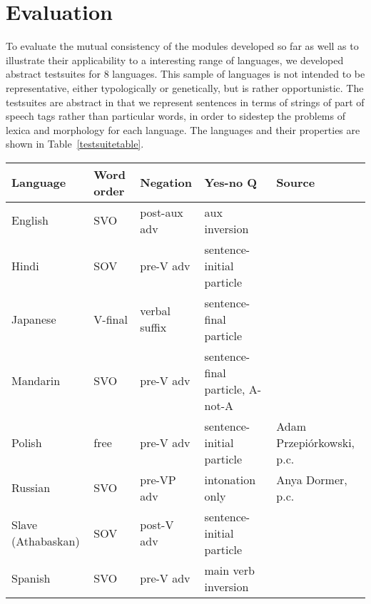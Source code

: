 \documentclass[11pt]{article}
\begin{document}
\section{Evaluation}

To evaluate the mutual consistency of the modules developed so far as
well as to illustrate their applicability to a interesting range of
languages, we developed abstract testsuites for 8 languages.  This
sample of languages is not intended to be representative, either
typologically or genetically, but is rather opportunistic.  The
testsuites are abstract in that we represent sentences in terms of
strings of part of speech tags rather than particular words, in order
to sidestep the problems of lexica and morphology for each language.
The languages and their properties are shown in Table~\ref{testsuitetable}.

\begin{table*}[ht]
\begin{center}
\small
\begin{tabular}{lllll}
\hline
Language & Word order & Negation & Yes-no Q\footnotemark & Source\\ \hline
English  & SVO	      & post-aux adv\footnotemark	& aux inversion &\\
Hindi    & SOV        & pre-V adv 	& sentence-initial particle& \cite{Sne:Wei:00}\\
Japanese & V-final    & verbal suffix   & sentence-final particle & \\
Mandarin & SVO	      & pre-V adv	& sentence-final particle, A-not-A & \cite{Li*81}\\
Polish   & free	      & pre-V adv       & sentence-initial particle & Adam Przepi\'{o}rkowski, p.c.\\
Russian	 & SVO	      & pre-VP adv	& intonation only & Anya Dormer, p.c.\\
Slave (Athabaskan) & SOV & post-V adv	& sentence-initial particle & \cite{Rice89}\\
Spanish  & SVO	      & pre-V adv	& main verb inversion & \\ \hline
\end{tabular}
\end{center}
\caption{Languages used in testing}
\label{testsuitetable}
\end{table*}

\addtocounter{footnote}{-1}
\addtocounter{footnote}{1}
\end{document}
